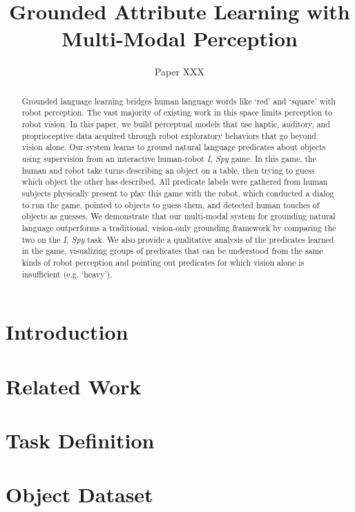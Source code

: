 \documentclass{article}
\title{Grounded Attribute Learning with Multi-Modal Perception}
\author{Paper XXX}
\newcommand{\ispy}{\textit{I, Spy}\xspace}
\begin{document}
\maketitle

\begin{abstract}
Grounded language learning bridges human language words like `red' and `square' with robot perception.
The vast majority of existing work in this space limits perception to robot vision.
In this paper, we build perceptual models that use haptic, auditory, and proprioceptive data acquired through robot exploratory behaviors that go beyond vision alone.
Our system learns to ground natural language predicates about objects using supervision from an interactive human-robot \ispy game.
In this game, the human and robot take turns describing an object on a table, then trying to guess which object the other has described.
All predicate labels were gathered from human subjects physically present to play this game with the robot, which conducted a dialog to run the game, pointed to objects to guess them, and detected human touches of objects as guesses.
We demonstrate that our multi-modal system for grounding natural language outperforms a traditional, vision-only grounding framework by comparing the two on the \ispy task.
We also provide a qualitative analysis of the predicates learned in the game, visualizing groups of predicates that can be understood from the same kinds of robot perception and pointing out predicates for which vision alone is insufficient (e.g. `heavy').
\end{abstract}

\section{Introduction}
\label{sec:introduction}
	

\section{Related Work}
\label{sec:relatedwork}
	

\section{Task Definition}
\label{sec:taskdefinition}
	

\section{Object Dataset}
\label{sec:dataset}
	
\end{document}
